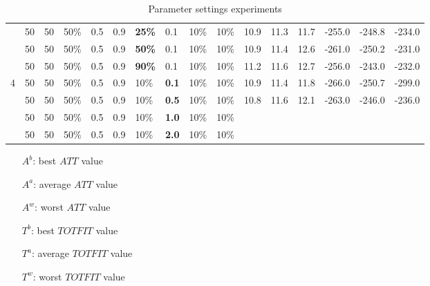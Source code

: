 \begin{table}
\begin{tabular}{|l|l|l|l|l|l|l|l|l|l||l|l|l|l|l|l|}
    ~ & 50 & 50 & 50\% & 0.5 & 0.9 & \textbf{25\%} & 0.1 & 10\% & 10\% &  10.9 & 11.3 & 11.7 & -255.0 & -248.8 & -234.0 \\
    ~ & 50 & 50 & 50\% & 0.5 & 0.9 & \textbf{50\%} & 0.1 & 10\% & 10\% &  10.9 & 11.4 & 12.6 & -261.0 & -250.2 & -231.0 \\
    ~ & 50 & 50 & 50\% & 0.5 & 0.9 & \textbf{90\%} & 0.1 & 10\% & 10\% &  11.2 & 11.6 & 12.7 & -256.0 & -243.0 & -232.0 \\
    \hline
    4 & 50 & 50 & 50\% & 0.5 & 0.9 & 10\% & \textbf{0.1} & 10\% & 10\% & 10.9 & 11.4 & 11.8 & -266.0 & -250.7 & -299.0  \\
    ~ & 50 & 50 & 50\% & 0.5 & 0.9 & 10\% & \textbf{0.5} & 10\% & 10\% & 10.8 & 11.6 & 12.1 & -263.0 & -246.0 & -236.0  \\
    ~ & 50 & 50 & 50\% & 0.5 & 0.9 & 10\% & \textbf{1.0} & 10\% & 10\% & ~ & ~ & ~ & ~ & ~ & ~  \\
    ~ & 50 & 50 & 50\% & 0.5 & 0.9 & 10\% & \textbf{2.0} & 10\% & 10\% & ~ & ~ & ~ & ~ & ~ & ~  \\
    \hline
    \end{tabular}
    \caption {Parameter settings experiments} 
    \begin{itemize}[noitemsep]
    \item[$A^b$:] best $ATT$ value
    \item[$A^a$:] average $ATT$ value
    \item[$A^w$:] worst $ATT$ value
    \item[$T^b$:] best $TOTFIT$ value
    \item[$T^a$:] average $TOTFIT$ value
    \item[$T^w$:] worst $TOTFIT$ value
    \end{itemize}
    \label{table:parameterSettingsLALLA}
\end{table}

